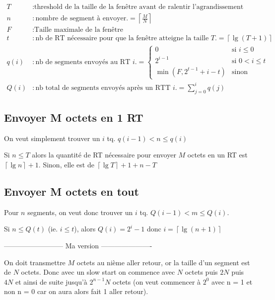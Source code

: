 \documentclass{article}
\begin{document}
\begin{align*}
    T &: \text{threshold de la taille de la fenêtre avant de ralentir l'agrandissement} \\
    n &: \text{nombre de segment à envoyer.} = \left\lceil \frac{M}{N} \right\rceil \\
    F &: \text{Taille maximale de la fenêtre} \\
    t &: \text{nb de RT nécessaire pour que la fenêtre atteigne la taille $T$.} = \left\lceil\lg(T+1)\right\rceil \\
    q(i) &: \text{nb de segments envoyés au RT $i$.} = 
    \left\{\begin{array}{ll}
         0 & \text{si } i\leq 0 \\
         2^{i-1} & \text{si } 0 < i \leq t \\
         \min(F, 2^{t-1}+i-t) & \text{sinon}
    \end{array}\right.\\
    Q(i) &: \text{nb total de segments envoyés après un RTT $i$.} = \displaystyle\sum_{j=0}^{i} q(j)
\end{align*}

\subsection{Envoyer M octets en 1 RT}
On veut simplement trouver un $i$ tq. $q(i-1) < n \leq q(i)$

Si $n \leq T$ alors la quantité de RT nécessaire pour envoyer $M$ octets en un RT est $\left\lceil\lg{n}\right\rceil+1$.
Sinon, elle est de $\left\lceil\lg{T}\right\rceil + 1 + n - T$

\subsection{Envoyer M octets en tout}
Pour $n$ segments, on veut donc trouver un $i$ tq. $Q(i-1) < m \leq Q(i)$.

Si $n \leq Q(t)$ (ie. $i \leq t$), alors $Q(i) = 2^i - 1$ donc $i = \left\lceil\lg(n+1)\right\rceil$

\hfill

-------------------------- Ma version ----------------------

\hfill

On doit transmettre $M$ octets au nième aller retour, or la taille d'un segment est de $N$ octets. Donc avec un slow start on commence avec $N$ octets puis $2N$ puis $4N$ et ainsi de suite jusqu'à $2^{n-1}N$ octets (on veut commencer à $2^0$ avec n = 1 et non n = 0 car on aura alors fait 1 aller retour).
\end{document}
